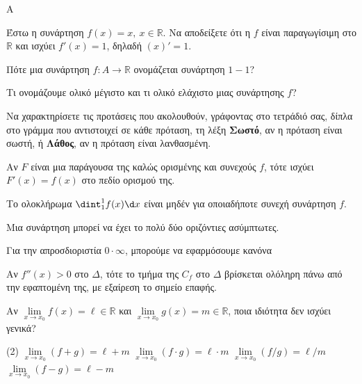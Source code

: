 \begin{thema}{A}
\begin{erwthma}
    \item Έστω η συνάρτηση $f(x)=x,\ x\in\mathbb{R}$. Να αποδείξετε ότι η $f$ είναι παραγωγίσιμη στο $\mathbb{R}$ και ισχύει $f'(x)=1$, δηλαδή $ (x)'=1 $.
    \item Πότε μια συνάρτηση $f:A\to\mathbb{R}$ ονομάζεται συνάρτηση $1-1$?
    \item Τι ονομάζουμε ολικό μέγιστο και τι ολικό ελάχιστο μιας συνάρτησης $f$?
    \item Να χαρακτηρίσετε τις προτάσεις που ακολουθούν, γράφοντας στο τετράδιό σας, δίπλα στο γράμμα που αντιστοιχεί σε κάθε πρόταση, τη λέξη \textbf{Σωστό}, αν η πρόταση είναι σωστή, ή \textbf{Λάθος}, αν η πρόταση είναι λανθασμένη.
    \begin{alist}
        \item Αν $F$ είναι μια παράγουσα της καλώς ορισμένης και συνεχούς $f$, τότε ισχύει $F'(x) = f(x)$ στο πεδίο ορισμού της.
        \item Το ολοκλήρωμα $\dint_1^1 f(x)\d x$ είναι μηδέν για οποιαδήποτε συνεχή συνάρτηση $f$.
        \item Μια συνάρτηση μπορεί να έχει το πολύ δύο οριζόντιες ασύμπτωτες.
        \item Για την απροσδιοριστία $0 \cdot \infty$, μπορούμε να εφαρμόσουμε κανόνα 
        \item Αν $f''(x)>0$ στο $\Delta$, τότε το τμήμα της $C_f$ στο $\Delta$ βρίσκεται ολόληρη πάνω από την εφαπτομένη της, με εξαίρεση το σημείο επαφής.
    \end{alist}
    \item Αν $\lim\limits_{x\to x_0} f(x) = \ell\in\mathbb{R}$ και $\lim\limits_{x\to x_0} g(x) = m\in\mathbb{R}$, ποια ιδιότητα δεν ισχύει γενικά?
    \begin{tasks}[label=\let\textdexiakeraia\relax\alph*.](2)
        \task $\lim\limits_{x\to x_0} (f+g) = \ell + m$
        \task $\lim\limits_{x\to x_0} (f \cdot g) = \ell \cdot m$
        \task $\lim\limits_{x\to x_0} (f/g) = \ell/m$
        \task $\lim\limits_{x\to x_0} (f - g) = \ell - m$
    \end{tasks}
\end{erwthma}
\end{thema}


